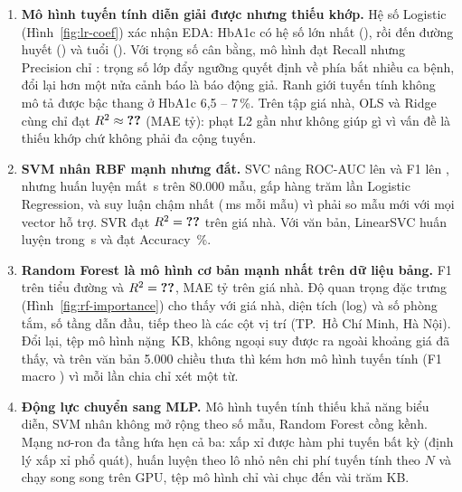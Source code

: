 \begin{enumerate}
  \item \textbf{Mô hình tuyến tính diễn giải được nhưng thiếu khớp.} Hệ số Logistic (Hình~\ref{fig:lr-coef}) xác nhận EDA:
    HbA1c có hệ số lớn nhất (), rồi đến đường huyết () và tuổi
    (). Với trọng số cân bằng, mô hình đạt Recall  nhưng
    Precision chỉ : trọng số lớp đẩy ngưỡng quyết định về phía bắt nhiều ca bệnh,
    đổi lại hơn một nửa cảnh báo là báo động giả. Ranh giới tuyến tính không mô tả được bậc thang ở HbA1c 6,5 -- 7\,\%.
    Trên tập giá nhà, OLS và Ridge cùng chỉ đạt $R^2 \approx \SL{ch2_sklearn/house/ols/r2}$ (MAE
     tỷ): phạt L2 gần như không giúp gì vì vấn đề là thiếu khớp chứ không phải đa cộng tuyến.
  \item \textbf{SVM nhân RBF mạnh nhưng đắt.} SVC nâng ROC-AUC lên  và F1 lên
    , nhưng huấn luyện mất \,s trên 80.000 mẫu, gấp
    hàng trăm lần Logistic Regression, và suy luận chậm nhất (\,ms mỗi mẫu) vì phải so
    mẫu mới với mọi vector hỗ trợ. SVR đạt $R^2 = \SL{ch2_sklearn/house/svr/r2}$ trên giá nhà. Với văn bản, LinearSVC huấn
    luyện trong \,s và đạt Accuracy \,\%.
  \item \textbf{Random Forest là mô hình cơ bản mạnh nhất trên dữ liệu bảng.} F1  trên tiểu
    đường và $R^2 = \SL{ch2_sklearn/house/rf/r2}$, MAE  tỷ trên giá nhà. Độ quan trọng đặc
    trưng (Hình~\ref{fig:rf-importance}) cho thấy với giá nhà, diện tích (log) và số phòng tắm, số tầng dẫn đầu, tiếp theo là
    các cột vị trí (TP.~Hồ Chí Minh, Hà Nội). Đổi lại, tệp mô hình nặng \,KB, không ngoại
    suy được ra ngoài khoảng giá đã thấy, và trên văn bản 5.000 chiều thưa thì kém hơn mô hình tuyến tính (F1 macro
    ) vì mỗi lần chia chỉ xét một từ.
  \item \textbf{Động lực chuyển sang MLP.} Mô hình tuyến tính thiếu khả năng biểu diễn, SVM nhân không mở rộng theo số mẫu,
    Random Forest cồng kềnh. Mạng nơ-ron đa tầng hứa hẹn cả ba: xấp xỉ được hàm phi tuyến bất kỳ (định lý xấp xỉ phổ quát),
    huấn luyện theo lô nhỏ nên chi phí tuyến tính theo $N$ và chạy song song trên GPU, tệp mô hình chỉ vài chục đến vài trăm KB.
\end{enumerate}

